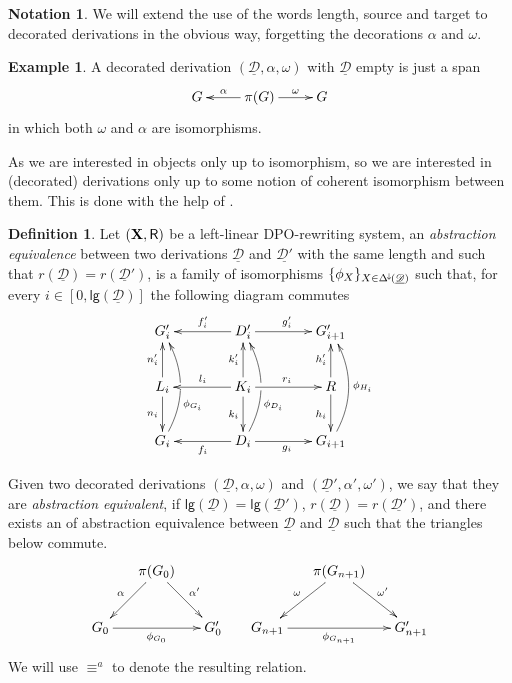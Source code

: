 \documentclass[a4paper]{article}
\newcommand{\Deltamin}{\Delta^{\hspace{-1pt}\downarrow\hspace{-1pt}}}
\def\R{\mathsf{R}}
\def\X{\textbf {\textup{X}}}
\newcommand{\dder}[1]{\mathscr{#1}}
\newcommand{\der}[1]{\underline{\dder{#1}}}
\newcommand{\lgh}[0]{\mathsf{lg}}
\theoremstyle{definition}
\newtheorem{definition}[theorem]{Definition}
\newtheorem*{notation}{Notation}
\newtheorem{example}[theorem]{Example}
\begin{document}
\begin{notation}
	We will extend the use of the words length, source and target to decorated derivations in the obvious way, forgetting the decorations $\alpha$ and $\omega$.
\end{notation}

\begin{example}A decorated derivation $(\der{D}, \alpha, \omega)$ with $\der{D}$ empty is just a span
	\[\xymatrix{G & \pi(G) \ar[r]^-{\omega} \ar[l]_-{\alpha} & G}\]
	in which both $\omega$ and $\alpha$ are isomorphisms.
\end{example}

As we are interested in objects only up to isomorphism, so we are interested in (decorated) derivations only up to some notion of coherent isomorphism between them. This is done with the help of .

\begin{definition}Let $(\X, \R)$ be a left-linear DPO-rewriting system,  an \emph{abstraction equivalence} between two derivations $\der{D}$ and $\der{D'}$ with the same length and such that $r(\der{D})=r(\der{D}')$, is a family of isomorphisms $\{\phi_X\}_{X\in \Deltamin(\der{D})}$ such that, for every $i\in [0, \lgh(\der{D})]$ the following diagram commutes
	\[\xymatrix@C=40pt{G'_i&D'_i \ar[r]^{g'_i} \ar[l]_{f'_i}&G'_{i+1}\\  L_i \ar[u]^{n'_i} \ar[d]_{n_i}& K_i \ar[u]^{k'_i} \ar[d]_{k_i} \ar[r]^{r_i} \ar[l]_{l_i} &R\ar[u]^{h'_i} \ar[d]_{h_i}\\G_i \ar@/_.45cm/[uu]_(.35){\phi_{G_i}}|\hole&D_i\ar[l]^{f_i}\ar@/_.45cm/[uu]_(.35){\phi_{D_i}}|\hole \ar[r]_{g_i}&G_{i+1}\ar@/_.45cm/[uu]_{\phi_{H_i}}}\]

Given two decorated derivations $(\der{D}, \alpha, \omega)$ and $(\der{D}', \alpha', \omega')$, we say that they are \emph{abstraction equivalent}, if $\lgh(\der{D})=\lgh(\der{D}')$, $r(\der{D})=r(\der{D'})$, and there exists an of abstraction equivalence between $\der{D}$ and  $\der{D}$ such that the triangles below commute.
\[\xymatrix@C=15pt{&\pi(G_0) \ar[dr]^{\alpha'} \ar[dl]_{\alpha}&&& \pi(G_{n+1}) \ar[dr]^{\omega'} \ar[dl]_{\omega}\\ G_0 \ar[rr]_{\phi_{G_0}} && G'_0 &G_{n+1} \ar[rr]_{\phi_{G_{n+1}}} && G'_{n+1} } \]
We will use $\equiv^a$ to denote the resulting relation.
\end{definition}
\end{document}
